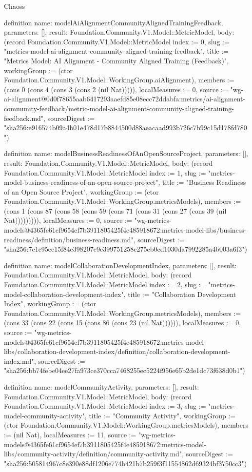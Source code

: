 \begin{lexlean}{Chaoss}
\begin{semanticmodule}
definition{
  name: modelAiAlignmentCommunityAlignedTrainingFeedback,
  parameters: [],
  result: Foundation.Community.V1.Model::MetricModel,
  body: (record Foundation.Community.V1.Model::MetricModel {index := 0, slug := "metrics-model-ai-alignment-community-aligned-training-feedback", title := "Metrics Model: AI Alignment - Community Aligned Training (Feedback)", workingGroup := (ctor Foundation.Community.V1.Model::WorkingGroup.aiAlignment), members := (cons 0 (cons 4 (cons 3 (cons 2 (nil Nat))))), localMeasures := 0, source := "wg-ai-alignment@0d0f78655aab6417293aaefd85e08ecc72ddabfa:metrics/ai-alignment-community-feedback/metric-model-ai-alignment-community-aligned-training-feedback.md", sourceDigest := "sha256:e916574b09a4b01e478d17b8844500d88aeacaad993b726c7b99c15d178fd780"})
}

definition{
  name: modelBusinessReadinessOfAnOpenSourceProject,
  parameters: [],
  result: Foundation.Community.V1.Model::MetricModel,
  body: (record Foundation.Community.V1.Model::MetricModel {index := 1, slug := "metrics-model-business-readiness-of-an-open-source-project", title := "Business Readiness of an Open Source Project", workingGroup := (ctor Foundation.Community.V1.Model::WorkingGroup.metricsModels), members := (cons 1 (cons 87 (cons 58 (cons 59 (cons 71 (cons 31 (cons 27 (cons 39 (nil Nat))))))))), localMeasures := 0, source := "wg-metrics-models@4365fe61cf9654ef7b3911805425f4e485918672:metrics-model-libs/business-readiness/definition/business-readiness.md", sourceDigest := "sha256:7c1e95ee15f84e398207e9c399751258c275eb0cd1030da7992285a4b003a6f3"})
}

definition{
  name: modelCollaborationDevelopmentIndex,
  parameters: [],
  result: Foundation.Community.V1.Model::MetricModel,
  body: (record Foundation.Community.V1.Model::MetricModel {index := 2, slug := "metrics-model-collaboration-development-index", title := "Collaboration Development Index", workingGroup := (ctor Foundation.Community.V1.Model::WorkingGroup.metricsModels), members := (cons 33 (cons 22 (cons 15 (cons 86 (cons 23 (nil Nat)))))), localMeasures := 0, source := "wg-metrics-models@4365fe61cf9654ef7b3911805425f4e485918672:metrics-model-libs/collaboration-development-index/definition/collaboration-development-index.md", sourceDigest := "sha256:bb74febe04ee27fa973ce370cca7468255ec5224f956e65b2de1dc73f638d0b1"})
}

definition{
  name: modelCommunityActivity,
  parameters: [],
  result: Foundation.Community.V1.Model::MetricModel,
  body: (record Foundation.Community.V1.Model::MetricModel {index := 3, slug := "metrics-model-community-activity", title := "Community Activity", workingGroup := (ctor Foundation.Community.V1.Model::WorkingGroup.metricsModels), members := (nil Nat), localMeasures := 11, source := "wg-metrics-models@4365fe61cf9654ef7b3911805425f4e485918672:metrics-model-libs/community-activity/definition/community-activity.md", sourceDigest := "sha256:505814967c8e390e88df1206e774b421b7b259f3f11554862d69324bf3750cc3"})
}


\end{semanticmodule}
\end{lexlean}
